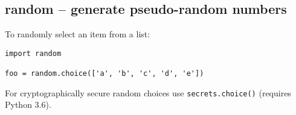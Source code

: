 \subsection{random -- generate pseudo-random numbers}
To randomly select an item from a list:
\begin{verbatim}
import random

foo = random.choice(['a', 'b', 'c', 'd', 'e'])
\end{verbatim}
For cryptographically secure random choices use \texttt{secrets.choice()} (requires Python 3.6).

